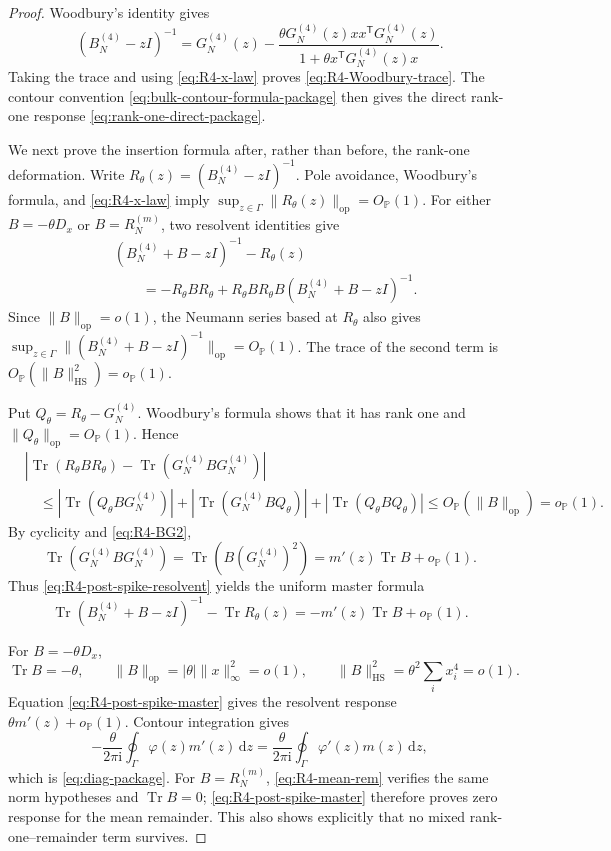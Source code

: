 \documentclass[11pt]{article}
\theoremstyle{definition}
\theoremstyle{remark}
\newcommand{\Tr}{\operatorname{Tr}}
\newcommand{\ii}{\mathrm i}
\newcommand{\dd}{\mathrm d}
\newcommand{\op}{\mathrm{op}}
\newcommand{\HS}{\mathrm{HS}}
\newcommand{\norm}[1]{\lVert #1\rVert}
\begin{document}
\begin{proof}
Woodbury's identity gives
\[
 (B_N^{(4)}-zI)^{-1}
 =G_N^{(4)}(z)
 -\frac{\theta G_N^{(4)}(z)xx^{\mathsf T}G_N^{(4)}(z)}
 {1+\theta x^{\mathsf T}G_N^{(4)}(z)x}.
\]
Taking the trace and using \eqref{eq:R4-x-law} proves
\eqref{eq:R4-Woodbury-trace}.  The contour convention
\eqref{eq:bulk-contour-formula-package} then gives the direct rank-one
response \eqref{eq:rank-one-direct-package}.

We next prove the insertion formula after, rather than before, the rank-one
deformation.  Write
\(R_\theta(z)=(B_N^{(4)}-zI)^{-1}\).  Pole avoidance, Woodbury's formula,
and \eqref{eq:R4-x-law} imply
\(\sup_{z\in\Gamma}\norm{R_\theta(z)}_{\op}=O_{\mathbb P}(1)\).
For either \(B=-\theta D_x\) or \(B=R_N^{(m)}\), two resolvent identities
give
\begin{align}
 &(B_N^{(4)}+B-zI)^{-1}-R_\theta(z)\nonumber\\
 &\qquad=-R_\theta BR_\theta
 +R_\theta BR_\theta B(B_N^{(4)}+B-zI)^{-1}.
 \label{eq:R4-post-spike-resolvent}
\end{align}
Since \(\norm B_{\op}=o(1)\), the Neumann series based at \(R_\theta\)
also gives
\(\sup_{z\in\Gamma}\norm{(B_N^{(4)}+B-zI)^{-1}}_{\op}
=O_{\mathbb P}(1)\).
The trace of the second term is
\(O_{\mathbb P}(\norm B_{\HS}^2)=o_{\mathbb P}(1)\).

Put \(Q_\theta=R_\theta-G_N^{(4)}\).  Woodbury's formula shows that it has
rank one and \(\norm{Q_\theta}_{\op}=O_{\mathbb P}(1)\).  Hence
\begin{align*}
 &\left|\Tr(R_\theta BR_\theta)
          -\Tr(G_N^{(4)}BG_N^{(4)})\right|\\
 &\quad\le
 |\Tr(Q_\theta BG_N^{(4)})|
 +|\Tr(G_N^{(4)}BQ_\theta)|
 +|\Tr(Q_\theta BQ_\theta)|
 \le O_{\mathbb P}(\norm B_{\op})=o_{\mathbb P}(1).
\end{align*}
By cyclicity and \eqref{eq:R4-BG2},
\[
 \Tr(G_N^{(4)}BG_N^{(4)})
 =\Tr(B(G_N^{(4)})^2)
 =m'(z)\Tr B+o_{\mathbb P}(1).
\]
Thus \eqref{eq:R4-post-spike-resolvent} yields the uniform master formula
\begin{equation}\label{eq:R4-post-spike-master}
 \Tr(B_N^{(4)}+B-zI)^{-1}-\Tr R_\theta(z)
 =-m'(z)\Tr B+o_{\mathbb P}(1).
\end{equation}

For \(B=-\theta D_x\),
\[
 \Tr B=-\theta,\qquad
 \norm B_{\op}=|\theta|\norm{x}_\infty^2=o(1),\qquad
 \norm B_{\HS}^2=\theta^2\sum_i x_i^4=o(1).
\]
Equation \eqref{eq:R4-post-spike-master} gives the resolvent response
\(\theta m'(z)+o_{\mathbb P}(1)\).  Contour integration gives
\[
 -\frac{\theta}{2\pi\ii}\oint_\Gamma\varphi(z)m'(z)\,\dd z
 =\frac{\theta}{2\pi\ii}\oint_\Gamma\varphi'(z)m(z)\,\dd z,
\]
which is \eqref{eq:diag-package}.  For \(B=R_N^{(m)}\),
\eqref{eq:R4-mean-rem} verifies the same norm hypotheses and
\(\Tr B=0\); \eqref{eq:R4-post-spike-master} therefore proves zero response
for the mean remainder.  This also shows explicitly that no mixed
rank-one--remainder term survives.
\end{proof}
\end{document}
